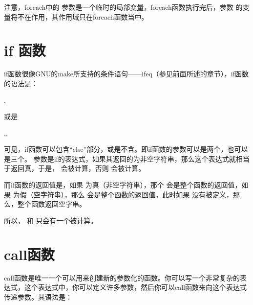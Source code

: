 \documentclass[a4paper,10pt]{sphinxmanual}
\begin{document}
注意，foreach中的  参数是一个临时的局部变量，foreach函数执行完后，参数 
的变量将不在作用，其作用域只在foreach函数当中。


\section{if 函数}
\label{\detokenize{functions:if}}
if函数很像GNU的make所支持的条件语句——ifeq（参见前面所述的章节），if函数的语法是：

\begin{sphinxVerbatim}[commandchars=\\\{\}]
 \PYGZlt{}\PYGZgt{},\PYGZlt{}\PYGZgt{}
\end{sphinxVerbatim}

或是

\begin{sphinxVerbatim}[commandchars=\\\{\}]
 \PYGZlt{}\PYGZgt{},\PYGZlt{}\PYGZgt{},\PYGZlt{}\PYGZgt{}
\end{sphinxVerbatim}

可见，if函数可以包含“else”部分，或是不含。即if函数的参数可以是两个，也可以是三个。
 参数是if的表达式，如果其返回的为非空字符串，那么这个表达式就相当于返回真，于是，  会被计算，否则  会被计算。

而if函数的返回值是，如果  为真（非空字符串），那个 
会是整个函数的返回值，如果  为假（空字符串），那么  会是整个函数的返回值，此时如果  没有被定义，那么，整个函数返回空字串。

所以，  和  只会有一个被计算。


\section{call函数}
\label{\detokenize{functions:call}}
call函数是唯一一个可以用来创建新的参数化的函数。你可以写一个非常复杂的表达式，这个表达式中，你可以定义许多参数，然后你可以call函数来向这个表达式传递参数。其语法是：
\end{document}
